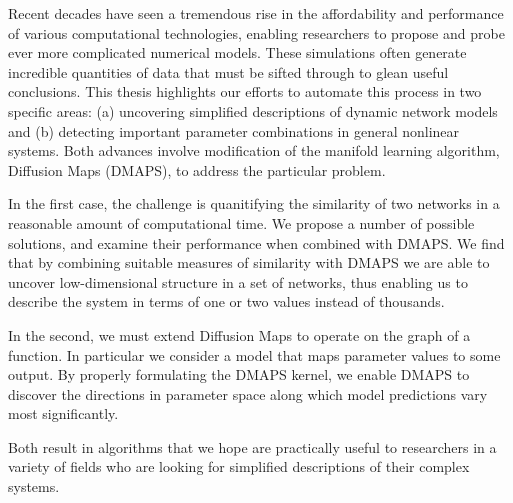 
Recent decades have seen a tremendous rise in the affordability and
performance of various computational technologies, enabling
researchers to propose and probe ever more complicated numerical
models. These simulations often generate incredible quantities of data
that must be sifted through to glean useful conclusions. This thesis
highlights our efforts to automate this process in two specific areas:
(a) uncovering simplified descriptions of dynamic network models and
(b) detecting important parameter combinations in general nonlinear
systems. Both advances involve modification of the manifold learning algorithm, Diffusion Maps (DMAPS), to
address the particular problem.

In the first case, the challenge is quanitifying the similarity of two
networks in a reasonable amount of computational time. We propose a
number of possible solutions, and examine their performance when
combined with DMAPS. We find that by combining suitable measures of
similarity with DMAPS we are able to uncover low-dimensional structure
in a set of networks, thus enabling us to describe the system in terms
of one or two values instead of thousands.

In the second, we must extend Diffusion Maps to operate on the graph
of a function. In particular we consider a model that maps parameter
values to some output. By properly formulating the DMAPS kernel, we enable DMAPS to discover the directions
in parameter space along which model predictions vary most
significantly.

Both result in algorithms that we hope are practically useful to
researchers in a variety of fields who are looking for simplified
descriptions of their complex systems.
